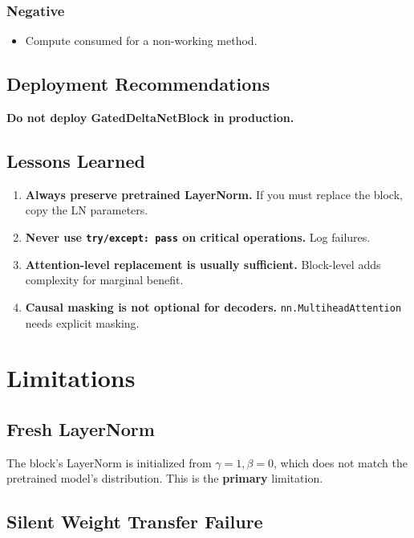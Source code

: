 \subsubsection{Negative}

\begin{itemize}
\item Compute consumed for a non-working method.

\end{itemize}
\subsection{Deployment Recommendations}

\textbf{Do not deploy GatedDeltaNetBlock in production.}

\subsection{Lessons Learned}

\begin{enumerate}
\item \textbf{Always preserve pretrained LayerNorm.} If you must replace the block,
  copy the LN parameters.
\item \textbf{Never use \texttt{try/except: pass} on critical operations.} Log failures.
\item \textbf{Attention-level replacement is usually sufficient.} Block-level adds
  complexity for marginal benefit.
\item \textbf{Causal masking is not optional for decoders.} \texttt{nn.MultiheadAttention}
  needs explicit masking.

\end{enumerate}



\section{Limitations}

\subsection{Fresh LayerNorm}

The block's LayerNorm is initialized from $\gamma = 1, \beta = 0$, which 
does not match the pretrained model's distribution. This is the \textbf{primary} 
limitation.

\subsection{Silent Weight Transfer Failure}

